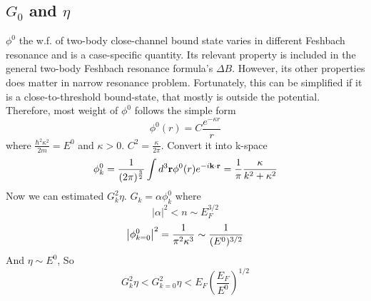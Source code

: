 \subsection{$G_0$ and $\eta$}
%
%
%
$\phi^{0}$ the w.f. of two-body close-channel bound state varies in different Feshbach resonance and is a case-specific quantity.  Its relevant property is included in the general two-body Feshbach resonance formula's $\Delta{B}$.  However, its other properties does matter in narrow resonance problem.  Fortunately, this can be simplified if it is a close-to-threshold bound-state, that mostly is outside the potential.  Therefore, most weight of $\phi^{0}$ follows the simple form 
\[
\phi^{0}(r)=C\frac{e^{-\kappa{r}}}{r}
\]
 where $\frac{\hbar^{2}\kappa^{2}}{2m}=E^{0}$ and $\kappa>0$.  $C^{2}=\frac{\kappa}{2\pi}$.  Convert it into k-space
 \begin{equation}\label{eq:20101011:phi}
\phi^{0}_k=\frac{1}{(2\pi)^{\frac32}}\int{d^{3}\ensuremath{\mathbf{r}}\phi^{0}(r)e^{-i\ensuremath{\mathbf{k}}\cdot\ensuremath{\mathbf{r}}}}=\frac{1}{\pi}\frac{\kappa}{k^{2}+\kappa^{2}}
\end{equation}
Now we can estimated $G_{k}^{2}\eta$. $G_{k}=\alpha\phi^{0}_{k}$ where 
\[|\alpha|^{2}<n\sim{E_{F}^{3/2}}\]
\[
\left\lvert{\phi^{0}_{k=0}}\right\rvert^{2}=\frac{1}{\pi^{2}\kappa^{3}}\sim\frac{1}{(E^{0})^{3/2}}
\]
And $\eta\sim{E^{0}}$, So 
\[
G_{k}^{2}\eta<G_{k=0}^{2}\eta<E_{F}(\frac{E_{F}}{E^{0}})^{1/2}
\]
